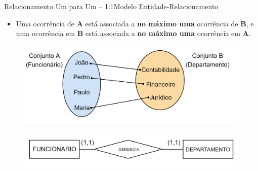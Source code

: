 \documentclass[t]{beamer}
\begin{document}
\begin{ftst}{Relacionamento Um para Um – 1:1}{Modelo Entidade-Relacionamento}
\begin{itemize}
    \item Uma ocorrência de \textbf{A} está associada a \textbf{no máximo uma} ocorrência de \textbf{B}, e uma ocorrência em \textbf{B} está associada a \textbf{no máximo uma} ocorrência em \textbf{A}.
\end{itemize}
\begin{figure}
    \centering
    \includegraphics[scale=0.15]{Figuras/01_15.png}
\end{figure}
\begin{figure}
    \centering
    \includegraphics[scale=0.2]{Figuras/01_14.png}
\end{figure}


\end{ftst}

\end{document}
